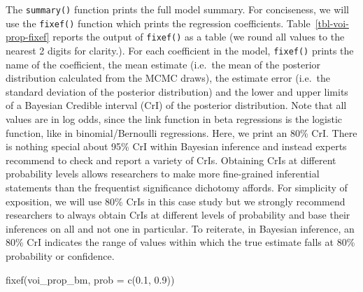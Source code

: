 \documentclass[
  authoryear,
  preprint,
  3p]{elsarticle}
\newenvironment{Shaded}{\begin{snugshade}}{\end{snugshade}}
\newcommand{\AttributeTok}[1]{\textcolor[rgb]{0.40,0.45,0.13}{#1}}
\newcommand{\FloatTok}[1]{\textcolor[rgb]{0.68,0.00,0.00}{#1}}
\newcommand{\FunctionTok}[1]{\textcolor[rgb]{0.28,0.35,0.67}{#1}}
\newcommand{\NormalTok}[1]{\textcolor[rgb]{0.00,0.23,0.31}{#1}}
\begin{document}
The \texttt{summary()} function prints the full model summary. For
conciseness, we will use the \texttt{fixef()} function which prints the
regression coefficients. Table~\ref{tbl-voi-prop-fixef} reports the
output of \texttt{fixef()} as a table (we round all values to the
nearest 2 digits for clarity.). For each coefficient in the model,
\texttt{fixef()} prints the name of the coefficient, the mean estimate
(i.e.~the mean of the posterior distribution calculated from the MCMC
draws), the estimate error (i.e.~the standard deviation of the posterior
distribution) and the lower and upper limits of a Bayesian Credible
interval (CrI) of the posterior distribution. Note that all values are
in log odds, since the link function in beta regressions is the logistic
function, like in binomial/Bernoulli regressions. Here, we print an 80\%
CrI. There is nothing special about 95\% CrI within Bayesian inference
and instead experts recommend to check and report a variety of CrIs.
Obtaining CrIs at different probability levels allows researchers to
make more fine-grained inferential statements than the frequentist
significance dichotomy affords. For simplicity of exposition, we will
use 80\% CrIs in this case study but we strongly recommend researchers
to always obtain CrIs at different levels of probability and base their
inferences on all and not one in particular. To reiterate, in Bayesian
inference, an 80\% CrI indicates the range of values within which the
true estimate falls at 80\% probability or confidence.

\begin{Shaded}
\begin{Highlighting}[]
\FunctionTok{fixef}\NormalTok{(voi\_prop\_bm, }\AttributeTok{prob =} \FunctionTok{c}\NormalTok{(}\FloatTok{0.1}\NormalTok{, }\FloatTok{0.9}\NormalTok{))}
\end{Highlighting}
\end{Shaded}
\end{document}
